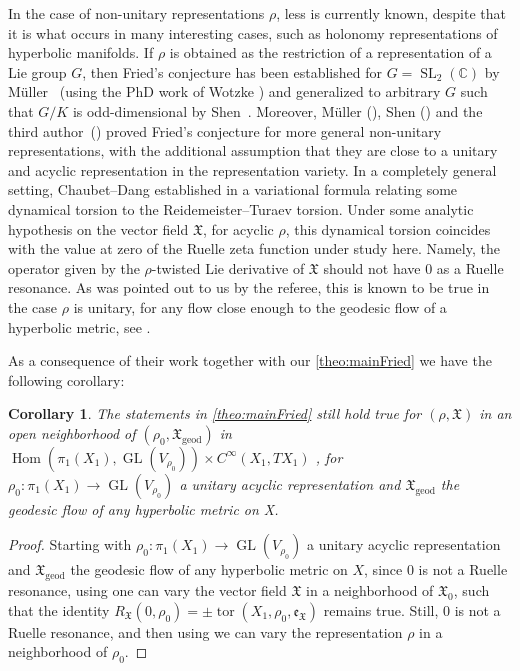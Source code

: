 \documentclass[JEP,XML,SOM,Unicode,NoFloatCountersInSection,published]{cedram}
\theoremstyle{plain}
\newtheorem{coralph}[thmalph]{Corollary}
\theoremstyle{definition}
\theoremstyle{remark}
\newcommand{\C}{\mathbb{C}}
\newcommand{\geod}{\mathrm{geod}}
\DeclareMathOperator{\SL}{SL}
\DeclareMathOperator{\GL}{GL}
\numberwithin{equation}{section}
\DeclareMathOperator{\tor}{tor}
\begin{document}
In the case of non-unitary representations $\rho$, less is currently known, despite that it is what occurs in many interesting cases, such as holonomy representations of hyperbolic manifolds. If $\rho$ is obtained as the restriction of a representation of a Lie group $G$, then Fried's conjecture has been established for $G=\SL_2(\C)$ by Müller~\cite{M2} (using the PhD work of Wotzke \cite{Wo}) and generalized to arbitrary $G$ such that $G/K$ is odd-dimensional by Shen~\cite{Shen21}. Moreover, Müller (\cite{muller2021ruelle}), Shen (\cite{Shen2020}) and the third author~(\cite{Spilioti20}) proved Fried's conjecture for more general non-unitary representations, with the additional assumption that they are close to a unitary and acyclic representation in the representation variety. In a completely general setting, Chaubet--Dang established in \cite{chaubet2019dynamical} a variational formula relating some dynamical torsion to the Reidemeister--Turaev torsion. Under some analytic hypothesis on the vector field $\mathfrak X$, for acyclic $\rho$, this dynamical torsion coincides with the value at zero of the Ruelle zeta function under study here. Namely, the operator given by the $\rho$-twisted Lie derivative of $\mathfrak X$ should not have $0$ as a Ruelle resonance. As was pointed out to us by the referee, this is known to be true in the case $\rho$ is unitary, for any flow close enough to the geodesic flow of a hyperbolic metric, see \cite[Lem.\,7.4]{dang2019fried}.

As a consequence of their work together with our \cref{theo:mainFried} we have the following corollary:
\begin{coralph}
The statements in \cref{theo:mainFried} still hold true for $(\rho, \mathfrak X)$ in an open neighborhood of $(\rho_0, \mathfrak X_\geod)$ in $\operatorname{Hom}(\pi_1(X_1), \GL(V_{\rho_0})) \times C^{\infty}(X_1, TX_1)$ , for $\rho_0 \colon \pi_1(X_1) \to \GL(V_{\rho_0})$ a unitary acyclic representation and $\mathfrak X_\geod$ the geodesic flow of any hyperbolic metric on X.
\end{coralph}

\begin{proof}
Starting with $\rho_0 \colon \pi_1(X_1) \to \GL(V_{\rho_0})$ a unitary acyclic representation and $\mathfrak X_\geod$ the geodesic flow of any hyperbolic metric on $X$, since $0$ is not a Ruelle resonance, using \cite[Th.\,2]{dang2019fried} one can vary the vector field $\mathfrak X$ in a neighborhood of $\mathfrak X_0$, such that the identity $R_{\mathfrak X}(0, \rho_0) = \pm \tor(X_1, \rho_0, \mathfrak e_{\mathfrak X})$
remains true. Still, $0$ is not a Ruelle resonance, and then using \cite[Th.\,4]{chaubet2019dynamical} we can vary the representation $\rho$ in a neighborhood of $\rho_0$.
\end{proof}
\end{document}
